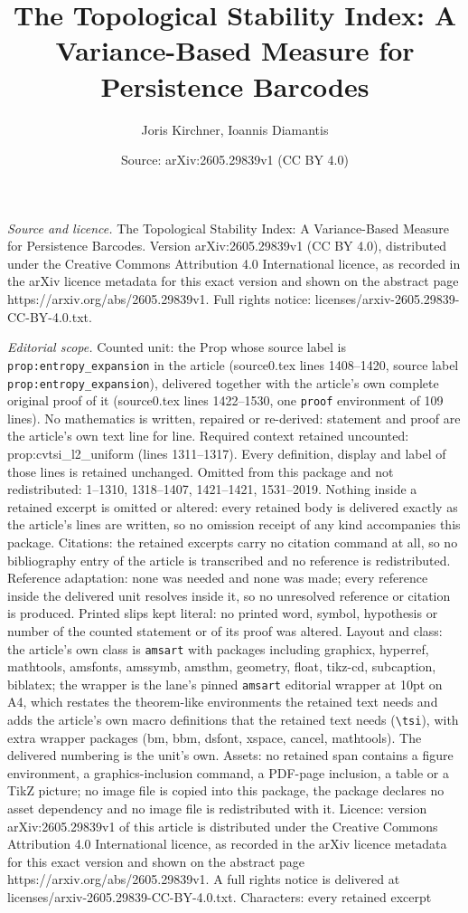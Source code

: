 \documentclass[10pt,a4paper]{amsart}
\title[The Topological Stability Index: A Variance-Based Measure fo]{The Topological Stability Index: A Variance-Based Measure for Persistence Barcodes}
\author{Joris Kirchner, Ioannis Diamantis}
\date{Source: arXiv:2605.29839v1 (CC BY 4.0)}
\begin{document}
\maketitle

\noindent\emph{Source and licence.} The Topological Stability Index: A Variance-Based Measure for Persistence Barcodes. Version arXiv:2605.29839v1 (CC BY 4.0), distributed under the Creative Commons Attribution 4.0 International licence, as recorded in the arXiv licence metadata for this exact version and shown on the abstract page https://arxiv.org/abs/2605.29839v1. Full rights notice: licenses/arxiv-2605.29839-CC-BY-4.0.txt.\par\smallskip

\noindent\textit{Editorial scope.} Counted unit: the Prop whose source label is \texttt{prop:entropy\_expansion} in the article (source0.tex lines 1408--1420, source label \texttt{prop:entropy\_expansion}), delivered together with the article's own complete original proof of it (source0.tex lines 1422--1530, one \texttt{proof} environment of 109 lines). No mathematics is written, repaired or re-derived: statement and proof are the article's own text line for line. Required context retained uncounted: prop:cvtsi\_l2\_uniform (lines 1311--1317). Every definition, display and label of those lines is retained unchanged. Omitted from this package and not redistributed: 1--1310, 1318--1407, 1421--1421, 1531--2019. Nothing inside a retained excerpt is omitted or altered: every retained body is delivered exactly as the article's lines are written, so no omission receipt of any kind accompanies this package. Citations: the retained excerpts carry no citation command at all, so no bibliography entry of the article is transcribed and no reference is redistributed. Reference adaptation: none was needed and none was made; every reference inside the delivered unit resolves inside it, so no unresolved reference or citation is produced. Printed slips kept literal: no printed word, symbol, hypothesis or number of the counted statement or of its proof was altered. Layout and class: the article's own class is \texttt{amsart} with packages including graphicx, hyperref, mathtools, amsfonts, amssymb, amsthm, geometry, float, tikz-cd, subcaption, biblatex; the wrapper is the lane's pinned \texttt{amsart} editorial wrapper at 10pt on A4, which restates the theorem-like environments the retained text needs and adds the article's own macro definitions that the retained text needs (\texttt{\textbackslash tsi}), with extra wrapper packages (bm, bbm, dsfont, xspace, cancel, mathtools). The delivered numbering is the unit's own. Assets: no retained span contains a figure environment, a graphics-inclusion command, a PDF-page inclusion, a table or a TikZ picture; no image file is copied into this package, the package declares no asset dependency and no image file is redistributed with it. Licence: version arXiv:2605.29839v1 of this article is distributed under the Creative Commons Attribution 4.0 International licence, as recorded in the arXiv licence metadata for this exact version and shown on the abstract page https://arxiv.org/abs/2605.29839v1. A full rights notice is delivered at licenses/arxiv-2605.29839-CC-BY-4.0.txt. Characters: every retained excerpt 
\end{document}
